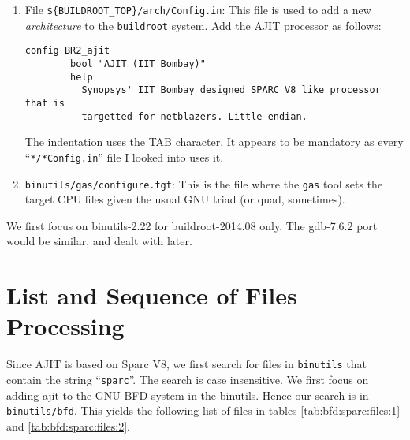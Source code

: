 \begin{enumerate}
\item File  \texttt{\$\{BUILDROOT\_TOP\}/arch/Config.in}: This file is
  used  to add  a  new \emph{architecture}  to the  \texttt{buildroot}
  system.  Add the AJIT processor as follows:

\hrulefill
\begin{verbatim}
config BR2_ajit
        bool "AJIT (IIT Bombay)"
        help
          Synopsys' IIT Bombay designed SPARC V8 like processor that is
          targetted for netblazers. Little endian.
\end{verbatim}    
\hrulefill

The indentation  uses the TAB  character.  It appears to  be mandatory
as every ``\texttt{*/*Config.in}'' file I looked into uses it.

\item \texttt{binutils/gas/configure.tgt}: This is  the file where the
  \texttt{gas}  tool sets  the target  CPU files  given the  usual GNU
  triad (or quad, sometimes).
\end{enumerate}

We  first  focus on  binutils-2.22  for  buildroot-2014.08 only.   The
gdb-7.6.2 port would be similar, and dealt with later.

\section{List and Sequence of Files Processing}
\label{sec:packaging:config:list:seq:processing}

Since  AJIT  is based  on  Sparc  V8, we  first  search  for files  in
\texttt{binutils}  that contain  the  string ``\texttt{sparc}''.   The
search is case insensitive.  We first  focus on adding ajit to the GNU
BFD   system   in   the    binutils.    Hence   our   search   is   in
\texttt{binutils/bfd}.  This yields the following list of files in
tables \ref{tab:bfd:sparc:files:1} and \ref{tab:bfd:sparc:files:2}.

